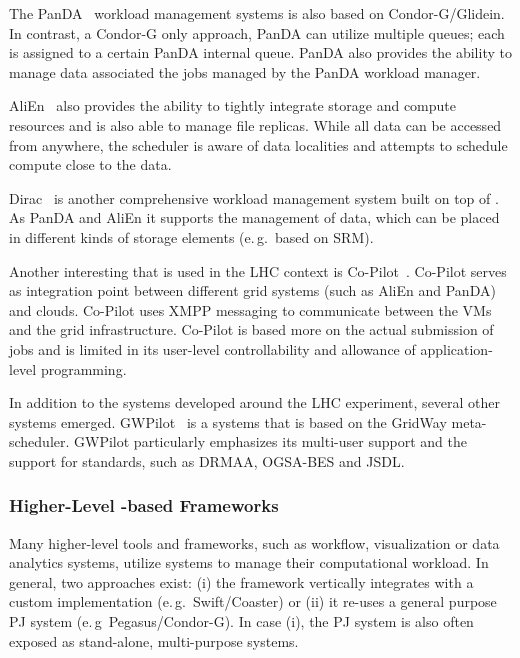 \documentclass{sig-alternate}
\begin{document}
The PanDA~\cite{1742-6596-331-7-072069} workload management systems is also 
based on Condor-G/Glidein. In contrast, a Condor-G only approach,
PanDA can utilize multiple queues; each \pilot is assigned to a certain PanDA
internal queue. PanDA also provides the ability to manage data associated the 
jobs managed by the PanDA workload manager.

AliEn~\cite{1742-6596-119-6-062012} also provides the ability to tightly 
integrate storage and compute resources and is also able to manage file 
replicas. While all data can be accessed from anywhere, the scheduler is aware 
of data localities and attempts to schedule compute close to the data.

Dirac~\cite{1742-6596-219-6-062049} is another comprehensive workload
management system built on top of \pilots. As PanDA and AliEn it supports the
management of data, which can be placed in different kinds of storage elements
(e.\,g.\ based on SRM).

Another interesting \pilot that is used in the LHC context is
Co-Pilot~\cite{copilot-tr}. Co-Pilot serves as integration point between
different grid \pilotjob systems (such as AliEn and PanDA) and clouds.
Co-Pilot uses XMPP messaging to communicate between the VMs and the grid
infrastructure. Co-Pilot is based more on the actual submission of jobs and is
limited in its user-level controllability and allowance of application-level
programming.

In addition to the \pilotjob systems developed around the LHC experiment, 
several other systems emerged. GWPilot~\cite{gwpilot} is a \pilot systems that 
is based on the GridWay meta-scheduler. GWPilot particularly emphasizes its 
multi-user support and the support for standards, such as DRMAA, OGSA-BES and 
JSDL.

\subsubsection{Higher-Level \pilot-based Frameworks}

Many higher-level tools and frameworks, such as workflow,
visualization or data analytics systems, utilize \pilotjob systems to
manage their computational workload. In general, two approaches exist:
(i) the framework vertically integrates with a custom \pilotjob
implementation (e.\,g.\ Swift/Coaster) or (ii) it re-uses a general
purpose PJ system (e.\,g\ Pegasus/Condor-G). In case (i), the PJ
system is also often exposed as stand-alone, multi-purpose \pilotjob systems. 
\end{document}
